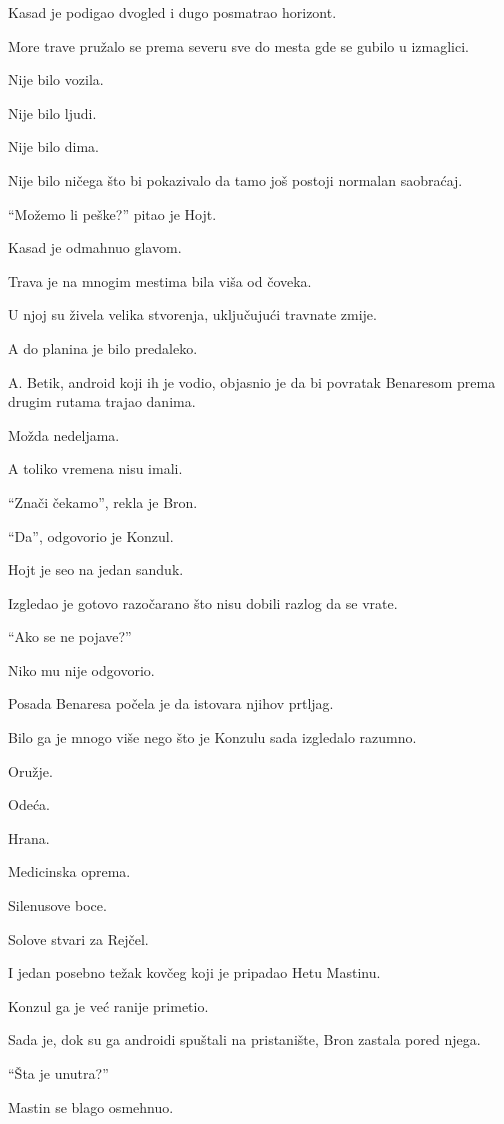 Kasad je podigao dvogled i dugo posmatrao horizont.

More trave pružalo se prema severu sve do mesta gde se gubilo u izmaglici.

Nije bilo vozila.

Nije bilo ljudi.

Nije bilo dima.

Nije bilo ničega što bi pokazivalo da tamo još postoji normalan saobraćaj.

``Možemo li peške?'' pitao je Hojt.

Kasad je odmahnuo glavom.

Trava je na mnogim mestima bila viša od čoveka.

U njoj su živela velika stvorenja, uključujući travnate zmije.

A do planina je bilo predaleko.

A. Betik, android koji ih je vodio, objasnio je da bi povratak Benaresom prema drugim rutama trajao danima.

Možda nedeljama.

A toliko vremena nisu imali.

``Znači čekamo'', rekla je Bron.

``Da'', odgovorio je Konzul.

Hojt je seo na jedan sanduk.

Izgledao je gotovo razočarano što nisu dobili razlog da se vrate.

``Ako se ne pojave?''

Niko mu nije odgovorio.

\bigskip

Posada Benaresa počela je da istovara njihov prtljag.

Bilo ga je mnogo više nego što je Konzulu sada izgledalo razumno.

Oružje.

Odeća.

Hrana.

Medicinska oprema.

Silenusove boce.

Solove stvari za Rejčel.

I jedan posebno težak kovčeg koji je pripadao Hetu Mastinu.

Konzul ga je već ranije primetio.

Sada je, dok su ga androidi spuštali na pristanište, Bron zastala pored njega.

``Šta je unutra?''

Mastin se blago osmehnuo.


